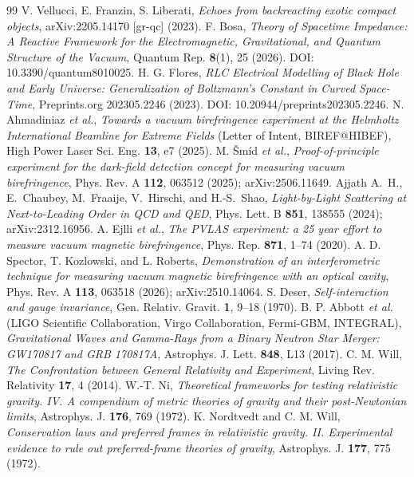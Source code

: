 \documentclass[11pt,a4paper]{article}
\theoremstyle{plain}
\theoremstyle{remark}
\begin{document}
\begin{thebibliography}{99}
 V. Vellucci, E. Franzin, S. Liberati, \textit{Echoes from backreacting exotic compact objects}, arXiv:2205.14170 [gr-qc] (2023).
 F. Bosa, \textit{Theory of Spacetime Impedance: A Reactive Framework for the Electromagnetic, Gravitational, and Quantum Structure of the Vacuum}, Quantum Rep. \textbf{8}(1), 25 (2026). DOI: 10.3390/quantum8010025.
 H. G. Flores, \textit{RLC Electrical Modelling of Black Hole and Early Universe: Generalization of Boltzmann's Constant in Curved Space-Time}, Preprints.org 202305.2246 (2023). DOI: 10.20944/preprints202305.2246.
 N. Ahmadiniaz \emph{et al.}, \emph{Towards a vacuum birefringence experiment at the Helmholtz International Beamline for Extreme Fields} (Letter of Intent, BIREF@HIBEF), High Power Laser Sci. Eng. \textbf{13}, e7 (2025).
 M. \v{S}m\'{i}d \emph{et al.}, \emph{Proof-of-principle experiment for the dark-field detection concept for measuring vacuum birefringence}, Phys. Rev. A \textbf{112}, 063512 (2025); arXiv:2506.11649.
 Ajjath A.~H., E.~Chaubey, M.~Fraaije, V.~Hirschi, and H.-S.~Shao, \emph{Light-by-Light Scattering at Next-to-Leading Order in QCD and QED}, Phys. Lett. B \textbf{851}, 138555 (2024); arXiv:2312.16956.
 A. Ejlli \emph{et al.}, \emph{The PVLAS experiment: a 25 year effort to measure vacuum magnetic birefringence}, Phys. Rep. \textbf{871}, 1--74 (2020).
 A. D. Spector, T. Kozlowski, and L. Roberts, \emph{Demonstration of an interferometric technique for measuring vacuum magnetic birefringence with an optical cavity}, Phys. Rev. A \textbf{113}, 063518 (2026); arXiv:2510.14064.
 S. Deser, \emph{Self-interaction and gauge invariance}, Gen. Relativ. Gravit. \textbf{1}, 9--18 (1970).
 B. P. Abbott \emph{et al.} (LIGO Scientific Collaboration, Virgo Collaboration, Fermi-GBM, INTEGRAL), \emph{Gravitational Waves and Gamma-Rays from a Binary Neutron Star Merger: GW170817 and GRB 170817A}, Astrophys. J. Lett. \textbf{848}, L13 (2017).
 C. M. Will, \emph{The Confrontation between General Relativity and Experiment}, Living Rev. Relativity \textbf{17}, 4 (2014).
 W.-T. Ni, \emph{Theoretical frameworks for testing relativistic gravity. IV. A compendium of metric theories of gravity and their post-Newtonian limits}, Astrophys. J. \textbf{176}, 769 (1972).
 K. Nordtvedt and C. M. Will, \emph{Conservation laws and preferred frames in relativistic gravity. II. Experimental evidence to rule out preferred-frame theories of gravity}, Astrophys. J. \textbf{177}, 775 (1972).

\end{thebibliography}
\end{document}
